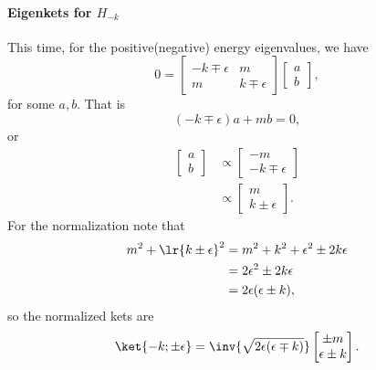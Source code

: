 \paragraph{Eigenkets for \( H_{-k} \)}
This time, for the positive(negative) energy eigenvalues, we have
%
\begin{equation}\label{eqn:gradQuantumProblemSet4Problem3:141}
0
=
\begin{bmatrix}
-k \mp \epsilon & m \\
m & k \mp \epsilon
\end{bmatrix}
\begin{bmatrix}
a \\
b
\end{bmatrix},
\end{equation}
%
for some \( a, b\).  That is
%
\begin{equation}\label{eqn:gradQuantumProblemSet4Problem3:161}
(-k \mp \epsilon) a + m b = 0,
\end{equation}
%
or
%
\begin{equation}\label{eqn:gradQuantumProblemSet4Problem3:181}
\begin{aligned}
\begin{bmatrix}
a \\
b
\end{bmatrix}
&\propto
\begin{bmatrix}
- m \\
-k \mp \epsilon
\end{bmatrix}
\\ &\propto
\begin{bmatrix}
m \\
k \pm \epsilon
\end{bmatrix}.
\end{aligned}
\end{equation}
%
For the normalization note that
%
\begin{equation}\label{eqn:gradQuantumProblemSet4Problem3:201}
\begin{aligned}
m^2 + \lr{ k \pm \epsilon }^2
&=
m^2 + k^2 + \epsilon^2 \pm 2 k \epsilon
\\ &=
2 \epsilon^2 \pm 2 k \epsilon
\\ &=
2 \epsilon (\epsilon \pm k),
\end{aligned}
\end{equation}
%
so the normalized kets are
%
\begin{equation}\label{eqn:gradQuantumProblemSet4Problem3:221}
\ket{-k; \pm\epsilon} =
\inv{\sqrt{2 \epsilon(\epsilon \mp k)}}
\begin{bmatrix}
\pm m \\
\epsilon \pm k
\end{bmatrix}.
\end{equation}
%
